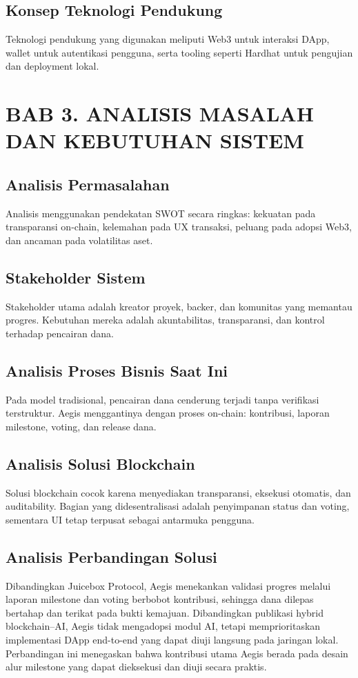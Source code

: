 \documentclass[12pt]{article}
\begin{document}
\subsection{Konsep Teknologi Pendukung}
Teknologi pendukung yang digunakan meliputi Web3 untuk interaksi DApp, wallet untuk autentikasi pengguna, serta tooling seperti Hardhat untuk pengujian dan deployment lokal.

\section{BAB 3. ANALISIS MASALAH DAN KEBUTUHAN SISTEM}
\subsection{Analisis Permasalahan}
Analisis menggunakan pendekatan SWOT secara ringkas: kekuatan pada transparansi on-chain, kelemahan pada UX transaksi, peluang pada adopsi Web3, dan ancaman pada volatilitas aset.

\subsection{Stakeholder Sistem}
Stakeholder utama adalah kreator proyek, backer, dan komunitas yang memantau progres. Kebutuhan mereka adalah akuntabilitas, transparansi, dan kontrol terhadap pencairan dana.

\subsection{Analisis Proses Bisnis Saat Ini}
Pada model tradisional, pencairan dana cenderung terjadi tanpa verifikasi terstruktur. Aegis menggantinya dengan proses on-chain: kontribusi, laporan milestone, voting, dan release dana.

\subsection{Analisis Solusi Blockchain}
Solusi blockchain cocok karena menyediakan transparansi, eksekusi otomatis, dan auditability. Bagian yang didesentralisasi adalah penyimpanan status dan voting, sementara UI tetap terpusat sebagai antarmuka pengguna.

\subsection{Analisis Perbandingan Solusi}
Dibandingkan Juicebox Protocol, Aegis menekankan validasi progres melalui laporan milestone dan voting berbobot kontribusi, sehingga dana dilepas bertahap dan terikat pada bukti kemajuan. Dibandingkan publikasi hybrid blockchain--AI, Aegis tidak mengadopsi modul AI, tetapi memprioritaskan implementasi DApp end-to-end yang dapat diuji langsung pada jaringan lokal. Perbandingan ini menegaskan bahwa kontribusi utama Aegis berada pada desain alur milestone yang dapat dieksekusi dan diuji secara praktis.\cite{juicebox,hybridai}
\end{document}
